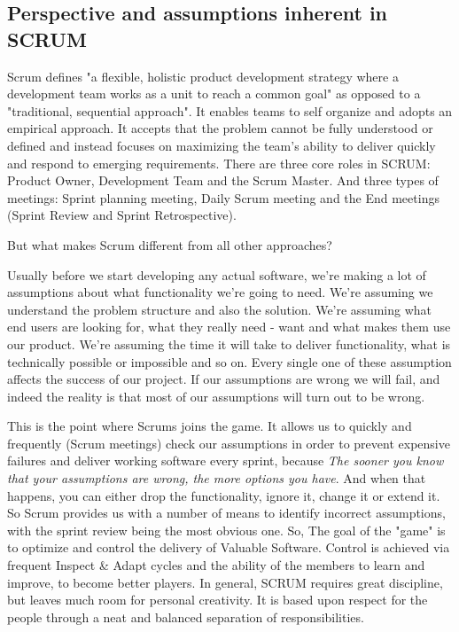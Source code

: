 \subsection{Perspective and assumptions inherent in SCRUM}
Scrum  defines "a flexible, holistic product development strategy where a development team works as a unit to reach a common goal" as opposed to a "traditional, sequential approach". It enables teams to self organize and adopts an empirical approach. It accepts that the problem cannot be fully understood or defined and instead focuses on maximizing the team's ability to deliver quickly and respond to emerging requirements.
There are three core roles in SCRUM: Product Owner, Development Team and the Scrum Master. And three types of meetings: Sprint planning meeting, Daily Scrum meeting and the End meetings (Sprint Review and Sprint Retrospective).
 
But what makes Scrum different from all other approaches?

 Usually before we start developing any actual software, we’re making a lot of assumptions about what functionality we’re going to need. We're assuming we understand the problem structure and also the solution. We’re assuming what end users are looking for, what they really need - want and what makes them use our product. We’re assuming the time it will take to deliver functionality, what is technically possible or impossible and so on. Every single one of these assumption affects the success of our project. If our assumptions are wrong we will fail, and indeed the reality is that most of our assumptions will turn out to be wrong.
 
This is the point where Scrums joins the game. It allows us to quickly and frequently (Scrum meetings) check our assumptions in order to prevent expensive failures and deliver working software every sprint, because \emph{The sooner you know that your assumptions are wrong, the more options you have}. And when that happens, you can either drop the functionality, ignore it, change it or extend it. So Scrum provides us with a number of means to identify incorrect assumptions, with the sprint review being the most obvious one. So, The goal of the "game" is to optimize and control the delivery of Valuable Software. Control is achieved via frequent Inspect \& Adapt cycles and the ability of the members to learn and improve, to become better players. In general, SCRUM requires great discipline, but leaves much room for personal creativity. It is based upon respect for the people through a neat and balanced separation of responsibilities.
 
